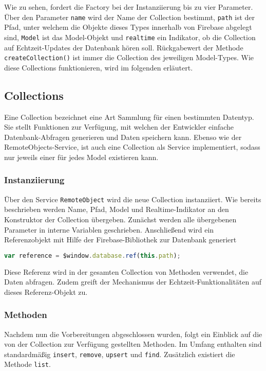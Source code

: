 Wie zu sehen, fordert die Factory bei der Instanziierung bis zu vier Parameter. Über den Parameter \texttt{name} wird der Name der Collection bestimmt, \texttt{path} ist der Pfad, unter welchem die Objekte dieses Types innerhalb von Firebase abgelegt sind, \texttt{Model} ist das Model-Objekt und \texttt{realtime} ein Indikator, ob die Collection auf Echtzeit-Updates der Datenbank hören soll.
Rückgabewert der Methode \texttt{createCollection()} ist immer die Collection des jeweiligen Model-Types.
Wie diese Collections funktionieren, wird im folgenden erläutert.

\subsection{Collections}
\label{subchap_coll}

Eine Collection bezeichnet eine Art Sammlung für einen bestimmten Datentyp. Sie stellt Funktionen zur Verfügung, mit welchen der Entwickler einfache Datenbank-Abfragen generieren und Daten speichern kann. Ebenso wie der RemoteObjects-Service, ist auch eine Collection als Service implementiert, sodass nur jeweils einer für jedes Model existieren kann.

\subsubsection{Instanziierung}
Über den Service \texttt{RemoteObject} wird die neue Collection instanziiert. Wie bereits beschrieben werden Name, Pfad, Model und Realtime-Indikator an den Konstruktor der Collection übergeben. Zunächst werden alle übergebenen Parameter in interne Variablen geschrieben. Anschließend wird ein Referenzobjekt mit Hilfe der Firebase-Bibliothek zur Datenbank generiert

 \begin{lstlisting}[language=Javascript, label=code_CollectionReference, caption=Befehl zum Generieren einer Firebase-Referenz]
 var reference = $window.database.ref(this.path);
\end{lstlisting}

Diese Referenz wird in der gesamten Collection von Methoden verwendet, die Daten abfragen. Zudem greift der Mechanismus der Echtzeit-Funktionalitäten auf dieses Referenz-Objekt zu.

\subsubsection{Methoden}
Nachdem nun die Vorbereitungen abgeschlossen wurden, folgt ein Einblick auf die von der Collection zur Verfügung gestellten Methoden.
Im Umfang enthalten sind standardmäßig \texttt{insert}, \texttt{remove}, \texttt{upsert} und \texttt{find}. Zusätzlich existiert die Methode \texttt{list}.

